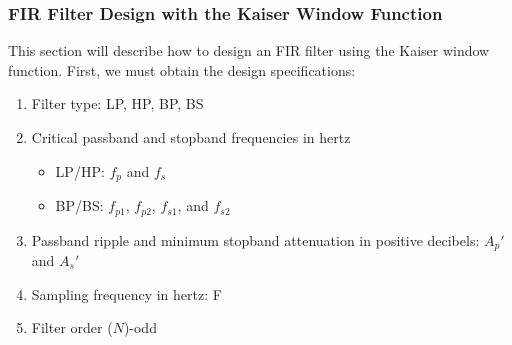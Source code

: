 \documentclass[11pt]{book}
\theoremstyle{example}
\begin{document}
\subsubsection{FIR Filter Design with the Kaiser Window Function}

This section will describe how to design an FIR filter using the Kaiser window function. First, we must obtain the design specifications:
\begin{enumerate}
	\item Filter type: LP, HP, BP, BS
	\item Critical passband and stopband frequencies in hertz
	\begin{itemize}
		\item LP/HP: $f_p$ and $f_s$
		\item BP/BS: $f_{p1}$, $f_{p2}$, $f_{s1}$, and $f_{s2}$
	\end{itemize}
	\item Passband ripple and minimum stopband attenuation in positive decibels: $A_p'$ and $A_s'$
	\item Sampling frequency in hertz: F
	\item Filter order ($N$)-odd	 
\end{enumerate}
\end{document}
